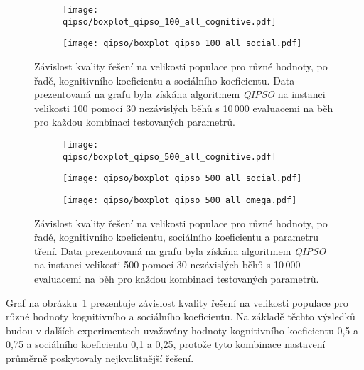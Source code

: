 \begin{figure}
    \centering
    \begin{subfigure}[b]{0.48\textwidth}
        \texttt{[image: qipso/boxplot\_qipso\_100\_all\_cognitive.pdf]}
    \end{subfigure}
    \hfill
    \begin{subfigure}[b]{0.48\textwidth}
        \texttt{[image: qipso/boxplot\_qipso\_100\_all\_social.pdf]}
    \end{subfigure}    
    \caption{Závislost kvality řešení na velikosti populace pro různé hodnoty, po řadě, kognitivního koeficientu a sociálního koeficientu. Data prezentovaná na grafu byla získána algoritmem \emph{QIPSO} na instanci velikosti 100 pomocí 30 nezávislých běhů s 10\,000 evaluacemi na běh pro každou kombinaci testovaných parametrů.}
    \label{fig:qipso-100-all-koeficients}
\end{figure}

\begin{figure}[ht!]
    \centering
    \begin{subfigure}[b]{0.48\textwidth}
        \centering
        \texttt{[image: qipso/boxplot\_qipso\_500\_all\_cognitive.pdf]}
    \end{subfigure}
    \hfill
    \begin{subfigure}[b]{0.48\textwidth}
        \centering
        \texttt{[image: qipso/boxplot\_qipso\_500\_all\_social.pdf]}
    \end{subfigure}

    \begin{subfigure}[b]{0.48\textwidth}
        \centering
        \texttt{[image: qipso/boxplot\_qipso\_500\_all\_omega.pdf]}
    \end{subfigure}
    \caption{Závislost kvality řešení na velikosti populace pro různé hodnoty, po řadě, kognitivního koeficientu, sociálního koeficientu a parametru tření. Data prezentovaná na grafu byla získána algoritmem \emph{QIPSO} na instanci velikosti 500 pomocí 30 nezávislých běhů s 10\,000 evaluacemi na běh pro každou kombinaci testovaných parametrů.}
    \label{fig:qipso-500-koef}
\end{figure}

Graf na obrázku~\ref{fig:qipso-100-all-koeficients} prezentuje závislost kvality řešení na velikosti populace pro různé hodnoty kognitivního a sociálního koeficientu.  
Na základě těchto výsledků budou v dalších experimentech uvažovány hodnoty kognitivního koeficientu 0{,}5 a 0{,}75 a sociálního koeficientu 0{,}1 a 0{,}25, protože tyto kombinace nastavení průměrně poskytovaly nejkvalitnější řešení. 

